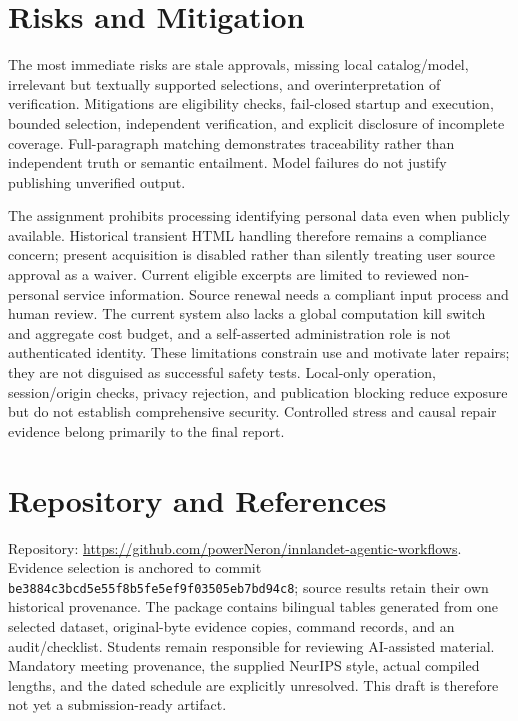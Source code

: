 \documentclass{article}
\begin{document}
\section{Risks and Mitigation}
The most immediate risks are stale approvals, missing local catalog/model, irrelevant but textually supported selections, and overinterpretation of verification. Mitigations are eligibility checks, fail-closed startup and execution, bounded selection, independent verification, and explicit disclosure of incomplete coverage. Full-paragraph matching demonstrates traceability rather than independent truth or semantic entailment. Model failures do not justify publishing unverified output.

The assignment prohibits processing identifying personal data even when publicly available. Historical transient HTML handling therefore remains a compliance concern; present acquisition is disabled rather than silently treating user source approval as a waiver. Current eligible excerpts are limited to reviewed non-personal service information. Source renewal needs a compliant input process and human review. The current system also lacks a global computation kill switch and aggregate cost budget, and a self-asserted administration role is not authenticated identity. These limitations constrain use and motivate later repairs; they are not disguised as successful safety tests. Local-only operation, session/origin checks, privacy rejection, and publication blocking reduce exposure but do not establish comprehensive security. Controlled stress and causal repair evidence belong primarily to the final report.

\section{Repository and References}
Repository: \url{https://github.com/powerNeron/innlandet-agentic-workflows}. Evidence selection is anchored to commit \texttt{be3884c3bcd5e55f8b5fe5ef9f03505eb7bd94c8}; source results retain their own historical provenance. The package contains bilingual tables generated from one selected dataset, original-byte evidence copies, command records, and an audit/checklist. Students remain responsible for reviewing AI-assisted material. Mandatory meeting provenance, the supplied NeurIPS style, actual compiled lengths, and the dated schedule are explicitly unresolved. This draft is therefore not yet a submission-ready artifact.
\label{maintextend}
\clearpage


\clearpage
\appendix
\end{document}
